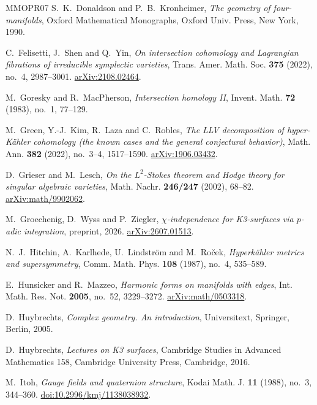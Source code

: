 \begin{thebibliography}{MMOPR07}
S.~K.~Donaldson and P.~B.~Kronheimer,
\emph{The geometry of four-manifolds}, Oxford Mathematical Monographs,
Oxford Univ. Press, New York, 1990.

C.~Felisetti, J.~Shen and Q.~Yin,
\emph{On intersection cohomology and Lagrangian fibrations of
irreducible symplectic varieties},
Trans. Amer. Math. Soc. \textbf{375} (2022), no.~4, 2987--3001.
\href{https://arxiv.org/abs/2108.02464}{arXiv:2108.02464}.

M.~Goresky and R.~MacPherson, \emph{Intersection homology II},
Invent. Math. \textbf{72} (1983), no.~1, 77--129.

M.~Green, Y.-J.~Kim, R.~Laza and C.~Robles,
\emph{The LLV decomposition of hyper-K\"ahler cohomology (the known
cases and the general conjectural behavior)},
Math. Ann. \textbf{382} (2022), no.~3--4, 1517--1590.
\href{https://arxiv.org/abs/1906.03432}{arXiv:1906.03432}.

D.~Grieser and M.~Lesch,
\emph{On the $L^2$-Stokes theorem and Hodge theory for singular
algebraic varieties}, Math. Nachr. \textbf{246/247} (2002), 68--82.
\href{https://arxiv.org/abs/math/9902062}{arXiv:math/9902062}.

M.~Groechenig, D.~Wyss and P.~Ziegler,
\emph{$\chi$-independence for K3-surfaces via $p$-adic integration},
preprint, 2026.
\href{https://arxiv.org/abs/2607.01513}{arXiv:2607.01513}.

N.~J.~Hitchin, A.~Karlhede, U.~Lindstr\"om and M.~Ro\v{c}ek,
\emph{Hyperk\"ahler metrics and supersymmetry},
Comm. Math. Phys. \textbf{108} (1987), no.~4, 535--589.

E.~Hunsicker and R.~Mazzeo,
\emph{Harmonic forms on manifolds with edges},
Int. Math. Res. Not. \textbf{2005}, no.~52, 3229--3272.
\href{https://arxiv.org/abs/math/0503318}{arXiv:math/0503318}.

D.~Huybrechts, \emph{Complex geometry. An introduction}, Universitext,
Springer, Berlin, 2005.

D.~Huybrechts, \emph{Lectures on K3 surfaces}, Cambridge Studies in
Advanced Mathematics 158, Cambridge University Press, Cambridge, 2016.

M.~Itoh, \emph{Gauge fields and quaternion structure},
Kodai Math. J. \textbf{11} (1988), no.~3, 344--360.
\href{https://doi.org/10.2996/kmj/1138038932}{doi:10.2996/kmj/1138038932}.


\end{thebibliography}

